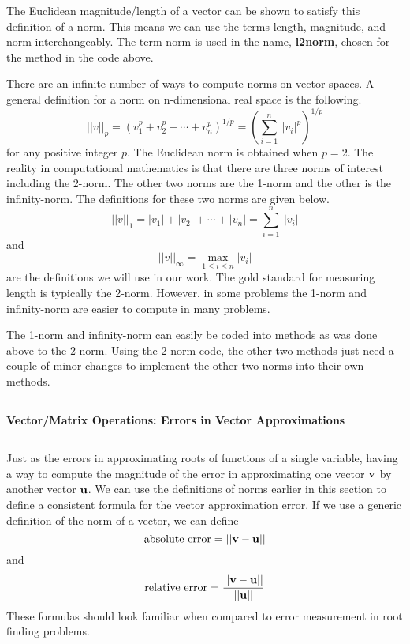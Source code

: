 \documentclass[10pt,fleqn]{article}
\begin{document}
The Euclidean magnitude/length of a vector can be shown to satisfy this
definition of a norm. This means we can use the terms length, magnitude, and
norm interchangeably. The term norm is used in the name, {\bf l2norm}, chosen
for the method in the code above.

There are an infinite number of ways to compute norms on vector spaces. A
general definition for a norm on n-dimensional real space is the following.
$$
  ||v||_p = \left( v_1^p + v_2^p + \cdots + v_n^p \right)^{1/p}
              = \left( \sum_{i=1}^n\ |v_i|^p \right)^{1/p}
$$
for any positive integer $p$. The Euclidean norm is obtained when $p=2$. The
reality in computational mathematics is that there are three norms of interest
including the 2-norm. The other two norms are the 1-norm and the other is the
infinity-norm.  The definitions for these two norms are given below.
$$
  ||v||_1 = | v_1 | + | v_2 | + \cdots + | v_n | = \sum_{i=1}^n\ |v_i|
$$
and
$$
  ||v||_\infty = \max_{1\leq i\leq n} | v_i | 
$$
are the definitions we will use in our work. The gold standard for measuring
length is typically the 2-norm. However, in some problems the 1-norm and
infinity-norm are easier to compute in many problems.

The 1-norm and infinity-norm can easily be coded into methods as was done above
to the 2-norm. Using the 2-norm code, the other two methods just need a couple
of minor changes to implement the other two norms into their own methods.
\newpage
\vskip0.1in\hrule\vskip0.1in
\noindent
{\bf Vector/Matrix Operations: Errors in Vector Approximations}
\vskip0.1in\hrule\vskip0.1in
\noindent
Just as the errors in approximating roots of functions of a single variable,
having a way to compute the magnitude of the error in approximating one vector
${\bf v}$ by another vector ${\bf u}$. We can use the definitions of norms
earlier in this section to define a consistent formula for the vector
approximation error. If we use a generic definition of the norm of a vector, we
can define
$$
  \makebox{absolute error} = || {\bf v} - {\bf u} ||
$$
and
$$
  \makebox{relative error} = {{|| {\bf v} - {\bf u} || }\over{ || {\bf u} || }}
$$
These formulas should look familiar when compared to error measurement in root
finding problems.
\end{document}
